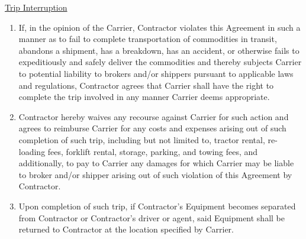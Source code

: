 \underline{Trip Interruption}
\begin{enumerate}[
    ref = \SecondLevelEnumerator
]
    \item If, in the opinion of the Carrier, Contractor violates this
    Agreement in such a manner as to fail to complete transportation of
    commodities in transit, abandons a shipment, has a breakdown, has an
    accident, or otherwise fails to expeditiously and safely deliver the
    commodities and thereby subjects Carrier to potential liability to
    brokers and/or shippers pursuant to applicable laws and regulations,
    Contractor agrees that Carrier shall have the right to complete the
    trip involved in any manner Carrier deems appropriate.

    \item Contractor hereby waives any recourse against Carrier for such
    action and agrees to reimburse Carrier for any costs and expenses
    arising out of such completion of such trip, including but not limited
    to, tractor rental, re-loading fees, forklift rental, storage, parking,
    and towing fees, and additionally, to pay to Carrier any damages for
    which Carrier may be liable to broker and/or shipper arising out of
    such violation of this Agreement by Contractor.

    \item Upon completion of such trip, if Contractor's Equipment becomes
    separated from Contractor or Contractor's driver or agent, said
    Equipment shall be returned to Contractor at the location specified by
    Carrier.
\end{enumerate}